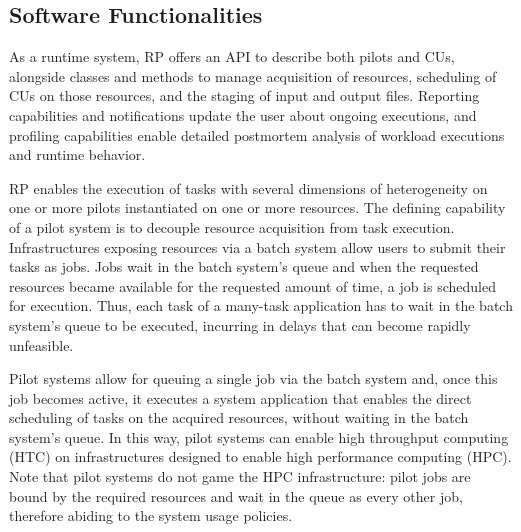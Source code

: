 \documentclass[preprint,12pt, a4paper]{elsarticle}
\begin{document}
\subsection{Software Functionalities}\label{ssec:functionalities}



As a runtime system, RP offers an API to describe both pilots and CUs,
alongside classes and methods to manage acquisition of resources, scheduling
of CUs on those resources, and the staging of input and output files.
Reporting capabilities and notifications update the user about ongoing
executions, and profiling capabilities enable detailed postmortem analysis of
workload executions and runtime behavior.

RP enables the execution of tasks with several dimensions of heterogeneity on
one or more pilots instantiated on one or more resources. The defining
capability of a pilot system is to decouple resource acquisition from task
execution. Infrastructures exposing resources via a batch system allow users
to submit their tasks as jobs. Jobs wait in the batch system's queue and when
the requested resources became available for the requested amount of time, a
job is scheduled for execution. Thus, each task of a many-task application
has to wait in the batch system's queue to be executed, incurring in delays
that can become rapidly unfeasible.

Pilot systems allow for queuing a single job via the batch system and, once
this job becomes active, it executes a system application that enables the
direct scheduling of tasks on the acquired resources, without waiting in the
batch system's queue. In this way, pilot systems can enable high throughput
computing (HTC) on infrastructures designed to enable high performance
computing (HPC). Note that pilot systems do not game the HPC infrastructure:
pilot jobs are bound by the required resources and wait in the queue as every
other job, therefore abiding to the system usage policies.
\end{document}
